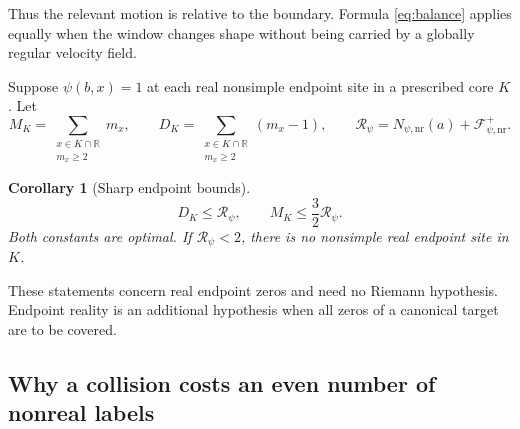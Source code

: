 \documentclass[11pt]{article}
\newcommand{\R}{\mathbb R}
\newcommand{\nr}{\mathrm{nr}}
\newcommand{\FF}{\mathcal F}
\newtheorem{corollary}[theorem]{Corollary}
\theoremstyle{remark}
\begin{document}
Thus the relevant motion is relative to the boundary. Formula
\eqref{eq:balance} applies equally when the window changes shape without
being carried by a globally regular velocity field.

Suppose $\psi(b,x)=1$ at each real nonsimple endpoint site in a prescribed
core $K$. Let
\[
 M_K=\sum_{\substack{x\in K\cap\R\\m_x\ge2}}m_x,
 \qquad D_K=\sum_{\substack{x\in K\cap\R\\m_x\ge2}}(m_x-1),
 \qquad \mathcal R_\psi=N_{\psi,\nr}(a)+\FF_{\psi,\nr}^{+}.
\]

\begin{corollary}[Sharp endpoint bounds]
\label{cor:multiplicity}
\begin{equation}
 \boxed{D_K\le\mathcal R_\psi,\qquad
 M_K\le\frac32\mathcal R_\psi.}
 \label{eq:sharp-bounds}
\end{equation}
Both constants are optimal. If $\mathcal R_\psi<2$, there is no nonsimple
real endpoint site in $K$.
\end{corollary}

These statements concern real endpoint zeros and need no Riemann
hypothesis. Endpoint reality is an additional hypothesis when all zeros
of a canonical target are to be covered.

\subsection{Why a collision costs an even number of nonreal labels}
\end{document}
